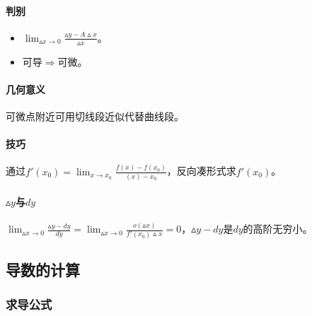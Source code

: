 \documentclass[
12pt, %
a4paper, 
oneside, %
headinclude,footinclude, %
]{scrartcl}
\begin{document}
\paragraph{判别}
\begin{itemize}
\item $ \lim_{\vartriangle x \to 0} \frac{\vartriangle y - A \vartriangle x}{\vartriangle x} $。
\item 可导$ \Rightarrow $可微。
\end{itemize}
\paragraph{几何意义}
可微点附近可用切线段近似代替曲线段。
\paragraph{技巧}
通过$ f'(x_0) = \lim_{x \to x_0}\frac{f(x)-f(x_0)}{(x) - x_0} $，反向凑形式求$ f'(x_0) $。
\paragraph{$ \vartriangle y $与$ dy $}
$ \lim_{\vartriangle x \to 0} \frac{\vartriangle y - dy}{dy} = \lim_{\vartriangle x \to 0} \frac{o(\vartriangle x)}{f'(x_0)\vartriangle x} = 0 $，$ \vartriangle y - dy $是$ dy $的高阶无穷小。
\subsection[导数的计算]{导数的计算}
\subsubsection[求导公式]{求导公式}
\end{document}
